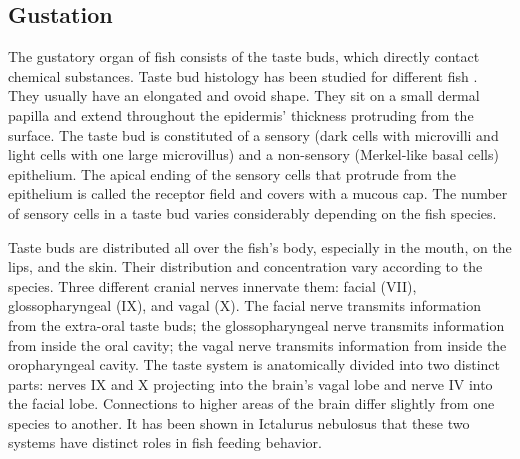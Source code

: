     \subsection{Gustation}
    The gustatory organ of fish consists of the taste buds, which directly contact chemical substances. Taste bud histology has been studied for different fish \cite{kapoor1976gustatory,fishelson2004taste,reutter2000heterogeneity,reutter1991ultrastructure,reutter2012taste}. They usually have an elongated and ovoid shape. They sit on a small dermal papilla and extend throughout the epidermis' thickness protruding from the surface. The taste bud is constituted of a sensory (dark cells with microvilli and light cells with one large microvillus) and a non-sensory (Merkel‐like basal cells) epithelium. The apical ending of the sensory cells that protrude from the epithelium is called the receptor field and covers with a mucous cap. The number of sensory cells in a taste bud varies considerably depending on the fish species.

    Taste buds are distributed all over the fish's body, especially in the mouth, on the lips, and the skin. Their distribution and concentration vary according to the species. Three different cranial nerves innervate them: facial (VII), glossopharyngeal (IX), and vagal (X). The facial nerve transmits information from the extra-oral taste buds; the glossopharyngeal nerve transmits information from inside the oral cavity; the vagal nerve transmits information from inside the oropharyngeal cavity. The taste system is anatomically divided into two distinct parts: nerves IX and X projecting into the brain's vagal lobe and nerve IV into the facial lobe. Connections to higher areas of the brain differ slightly from one species to another. It has been shown in Ictalurus nebulosus \cite{datema1971structures} that these two systems have distinct roles in fish feeding behavior.

